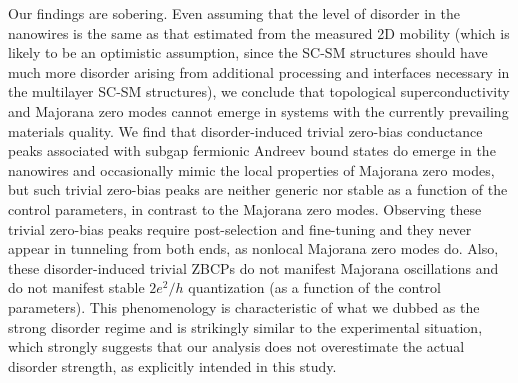 \documentclass[aps,prmaterials,twocolumn,superscriptaddress,longbibliography]{revtex4-2}
\begin{document}
Our findings are sobering. Even assuming that the level of disorder in the nanowires is the same as that estimated from the measured 2D mobility (which is likely to be an optimistic assumption, since the SC-SM structures should have much more disorder arising from additional processing and interfaces necessary in the multilayer SC-SM structures), we conclude that topological superconductivity and Majorana zero modes cannot emerge in systems with the currently prevailing materials quality.  We find that disorder-induced trivial zero-bias conductance peaks associated with subgap fermionic Andreev bound states do emerge in the nanowires and occasionally mimic the local properties of Majorana zero modes, but such trivial zero-bias peaks are neither generic nor stable as a function of the control parameters, in contrast to the Majorana zero modes.  Observing these trivial zero-bias peaks require post-selection and fine-tuning and they never appear in tunneling from both ends, as nonlocal Majorana zero modes do.  Also, these disorder-induced trivial ZBCPs do not manifest Majorana oscillations and do not manifest stable $2e^2/h$  quantization (as a function of the control parameters). This phenomenology is characteristic of what we dubbed as the strong disorder regime and is strikingly similar to the experimental situation, which strongly suggests that our analysis does not overestimate the actual disorder strength, as explicitly intended in this study.  
\end{document}
